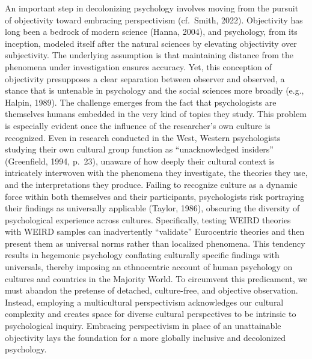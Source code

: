 \documentclass[
  11pt,
]{book}
\begin{document}
An important step in decolonizing psychology involves moving from the pursuit of objectivity toward embracing perspectivism (cf.~Smith, 2022). Objectivity has long been a bedrock of modern science (Hanna, 2004), and psychology, from its inception, modeled itself after the natural sciences by elevating objectivity over subjectivity. The underlying assumption is that maintaining distance from the phenomena under investigation ensures accuracy. Yet, this conception of objectivity presupposes a clear separation between observer and observed, a stance that is untenable in psychology and the social sciences more broadly (e.g., Halpin, 1989). The challenge emerges from the fact that psychologists are themselves humans embedded in the very kind of topics they study. This problem is especially evident once the influence of the researcher's own culture is recognized. Even in research conducted in the West, Western psychologists studying their own cultural group function as ``unacknowledged insiders'' (Greenfield, 1994, p.~23), unaware of how deeply their cultural context is intricately interwoven with the phenomena they investigate, the theories they use, and the interpretations they produce. Failing to recognize culture as a dynamic force within both themselves and their participants, psychologists risk portraying their findings as universally applicable (Taylor, 1986), obscuring the diversity of psychological experience across cultures. Specifically, testing WEIRD theories with WEIRD samples can inadvertently ``validate'' Eurocentric theories and then present them as universal norms rather than localized phenomena. This tendency results in hegemonic psychology conflating culturally specific findings with universals, thereby imposing an ethnocentric account of human psychology on cultures and countries in the Majority World. To circumvent this predicament, we must abandon the pretense of detached, culture-free, and objective observation. Instead, employing a multicultural perspectivism acknowledges our cultural complexity and creates space for diverse cultural perspectives to be intrinsic to psychological inquiry. Embracing perspectivism in place of an unattainable objectivity lays the foundation for a more globally inclusive and decolonized psychology.
\end{document}
